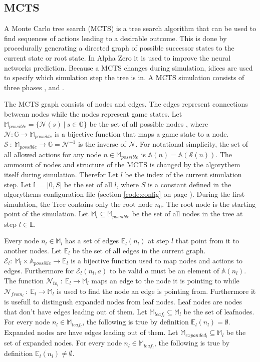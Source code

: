 \documentclass[12pt]{article}
\newcommand{\sectionref}[1]{section \ref{#1} on page \pageref{#1}}
\begin{document}
\subsection{MCTS}
A Monte Carlo tree search (MCTS) is a tree search algorithm that can be used to find sequences of actions leading to a desirable outcome. This is done by procedurally generating a directed graph of possible successor states to the current state or root state. In Alpha Zero it is used to improve the neural networks prediction.
Because a MCTS changes during simulation, idices are used to specify which simulation step the tree is in. A MCTS simulation consists of three phases ,  and .

The MCTS graph consists of nodes and edges. The edges represent connections betwean nodes while the nodes represent game states. Let \(\mathbb{M}_{possible} = \{\mathcal{N}(s)~|~ s \in \mathbb{G}\}\) be the set of all possible nodes , where \(\mathcal{N}:\mathbb{G}\to\mathbb{M}_{possible}\) is a bijective function that maps a game state to a node. \(\mathcal{S}~:~\mathbb{M}_{possible}\to\mathbb{G} = \mathcal{N}^{-1}\) is the inverse of \(\mathcal{N}\). For notational simplicity, the set of all allowed actions for any node \(n\in\mathbb{M}_{possible}\) is \(\mathbb{A}(n) = \mathbb{A}(\mathcal{S}(n))\). The ammount of nodes and structure of the MCTS is changed by the algorythem itself during simulation. Therefor Let \(l\) be the index of the current simulation step. Let \(\mathbb L = \mathbb [0, S]\) be the set of all \(l\), where \(S\) is a constant defined in the algorythems configuration file (\sectionref{code:config}). During the first simulation, the Tree contains only the root node \(n_0\). The root node is the starting point of the simulation. Let \(\mathbb{M}_l \subseteq \mathbb{M}_{possible}\) be the set of all nodes in the tree at step \(l\in\mathbb L\).

 Every node \(n_l \in \mathbb{M}_l\) has a set of edges \(\mathbb{E}_l(n_l)\) at step \(l\) that point from it to another nodes. Let \(\mathbb{E}_l\) be the set of all edges in the current graph. \(\mathcal{E}_l:~\mathbb{M}_l\times \mathbb{A}_{possible} \to \mathbb{E}_l\) is a bijective function used to map nodes and actions to edges. Furthermore for \(\mathcal{E}_l(n_l, a)\) to be valid \(a\) must be an element of \(\mathbb{A}(n_l)\).  The function \(\mathcal{N}_{to_l}~:~\mathbb{E}_{l}\to\mathbb{M}_l\) maps an edge to the node it is pointing to while \(\mathcal{N}_{from_l}~:~\mathbb{E}_{l}\to\mathbb{M}_l\) is used to find the node an edge is pointing from.
Furthermore it is usefull to distingush expanded nodes from leaf nodes. Leaf nodes are nodes that don't have edges leading out of them. Let \(\mathbb{M}_{leaf_l} \subseteq \mathbb{M}_l\) be the set of leafnodes. For every node \(n_l\in \mathbb{M}_{leaf_l}\), the following is true by definition \(\mathbb{E}_l(n_l) = \emptyset\). Expanded nodes are have edges leading out of them. Let \(\mathbb{M}_{expanded_l} \subseteq \mathbb{M}_l\) be the set of expanded nodes. For every node \(n_l\in \mathbb{M}_{leaf_l}\), the following is true by definition \(\mathbb{E}_l(n_l) \neq \emptyset\).
\end{document}
